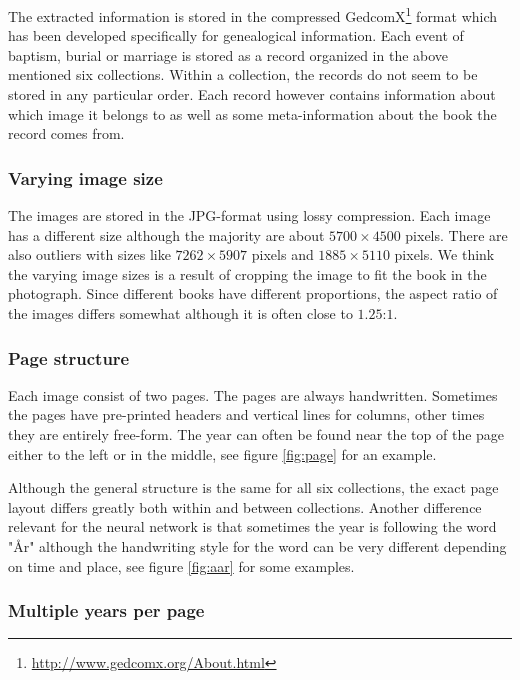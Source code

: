 The extracted information is stored in the compressed GedcomX\footnote{\url{http://www.gedcomx.org/About.html}} format which has been developed specifically for genealogical information.
Each event of baptism, burial or marriage is stored as a record organized in the above mentioned six collections. Within a collection, the records do not seem to be stored in any particular order. Each record however contains information about which image it belongs to as well as some meta-information about the book the record comes from.

\subsubsection{Varying image size}

The images are stored in the JPG-format using lossy compression. Each image has a different size although the majority are about $5700 \times 4500$ pixels. There are also outliers with sizes like $7262 \times 5907$ pixels and $1885 \times 5110$ pixels. We think the varying image sizes is a result of cropping the image to fit the book in the photograph.
Since different books have different proportions, the aspect ratio of the images differs somewhat although it is often close to $1.25$:$1$.

\subsubsection{Page structure}

Each image consist of two pages. The pages are always handwritten. Sometimes the pages have pre-printed headers and vertical lines for columns, other times they are entirely free-form.
The year can often be found near the top of the page either to the left or in the middle, see figure \ref{fig:page} for an example.



Although the general structure is the same for all six collections, the exact page layout differs greatly both within and between collections. Another difference relevant for the neural network is that sometimes the year is following the word "\r{A}r" although the handwriting style for the word can be very different depending on time and place, see figure \ref{fig:aar} for some examples.


\subsubsection{Multiple years per page} \label{sssec:swe_multiyear}

